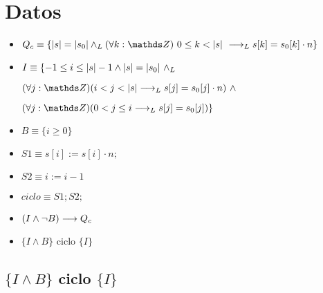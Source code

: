 \documentclass{article}
\begin{document}
\section*{Datos}
\begin{itemize}
    \item $Q_{c}    \equiv \{ \longitud{s} = \longitud{s_0} \yLuego \paraTodo{k}{0}{\longitud{s}} \implicaLuego s[k] = s_0[k] \cdot n    \} $

    \item $I        \equiv \{ -1 \leq i \leq \longitud{s} - 1 \wedge \longitud{s} = \longitud{s_0}\ \yLuego$

        $(\forall j: \ent)( i < j < \longitud{s} \implicaLuego s[j] = s_0[j] \cdot n)\ \wedge$

        $(\forall j: \ent)( 0 < j \leq i \implicaLuego s[j] = s_0[j]) \} $

    \item $B        \equiv \{ i \geq 0 \}$
    \item $S1       \equiv s[i]:= s[i] \cdot n; $
    \item $S2       \equiv i:= i - 1$
    \item $ciclo    \equiv S1;S2;$
\end{itemize}

\begin{itemize}
    \item $(I \wedge \neg B) \longrightarrow Q_{c}$
    \item $\{I \wedge B\}$ ciclo $\{ I \}$
\end{itemize}

\subsection*{$\{I \wedge B\}$ ciclo $\{ I \}$}
\end{document}
